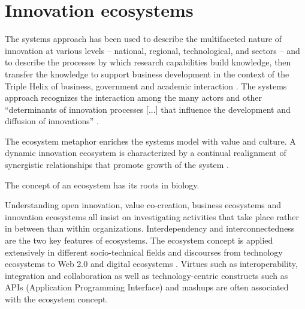 \chapter{Innovation ecosystems}
\label{ch:innovationecosystems}

The systems approach has been used to describe the multifaceted nature of innovation at various levels – national, regional, technological, and sectors – and to describe the processes by which research capabilities build knowledge, then transfer the knowledge to support business development in the context of the Triple Helix of business, government and academic interaction \citep{Etzkowitz2000}. The systems approach recognizes the interaction among the many actors and other “determinants of innovation processes [...] that influence the development and diffusion of innovations” \citep{Russell1999}. 

The ecosystem metaphor enriches the systems model with value and culture. A dynamic innovation ecosystem is characterized by a continual realignment of synergistic relationships that promote growth of the system \citep{Russell2015}.

The concept of an ecosystem has its roots in biology. 



Understanding open innovation, value co-creation, business ecosystems and innovation ecosystems all insist on investigating activities that take place rather in between than within organizations. Interdependency and interconnectedness are the two key features of ecosystems. The ecosystem concept is applied extensively in different socio-technical fields and discourses from technology ecosystems to Web 2.0 and digital ecosystems \citep{Dini2005}. Virtues such as interoperability, integration and collaboration as well as technology-centric constructs such as APIs (Application Programming Interface) and mashups are often associated with the ecosystem concept.

